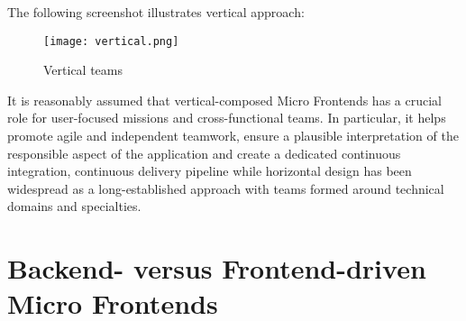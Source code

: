 \documentclass[a4paper]{book}
\begin{document}
The following screenshot illustrates vertical approach:

\begin{figure}[h!]
    \centering
    \captionsetup{justification=centering}
    \texttt{[image: vertical.png]}
    \caption{Vertical teams \cite{Gee20}}
    \label{fig:2}
\end{figure}

It is reasonably assumed that vertical-composed Micro Frontends has a crucial role for user-focused missions and cross-functional teams. In particular, it helps promote agile and independent teamwork, ensure a plausible interpretation of the responsible aspect of the application and create a dedicated continuous integration, continuous delivery pipeline while horizontal design has been widespread as a long-established approach with teams formed around technical domains and specialties.

\section{Backend- versus Frontend-driven Micro Frontends}
\end{document}
